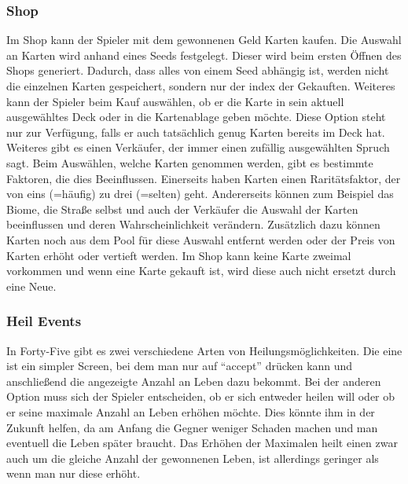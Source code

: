 \subsubsection{Shop}\label{subsubsec:shop}
Im Shop kann der Spieler mit dem gewonnenen Geld Karten kaufen.
Die Auswahl an Karten wird anhand eines Seeds festgelegt.
Dieser wird beim ersten Öffnen des Shops generiert.
Dadurch, dass alles von einem Seed abhängig ist, werden nicht die einzelnen Karten gespeichert, sondern nur der index der Gekauften.
Weiteres kann der Spieler beim Kauf auswählen, ob er die Karte in sein aktuell ausgewähltes Deck oder in die Kartenablage geben möchte.
Diese Option steht nur zur Verfügung, falls er auch tatsächlich genug Karten bereits im Deck hat.
Weiteres gibt es einen Verkäufer, der immer einen zufällig ausgewählten Spruch sagt.
Beim Auswählen, welche Karten genommen werden, gibt es bestimmte Faktoren, die dies Beeinflussen.
Einerseits haben Karten einen Raritätsfaktor, der von eins (=häufig) zu drei (=selten) geht.
Andererseits können zum Beispiel das Biome, die Straße selbst und auch der Verkäufer die Auswahl der Karten beeinflussen und deren Wahrscheinlichkeit verändern.
Zusätzlich dazu können Karten noch aus dem Pool für diese Auswahl entfernt werden oder der Preis von Karten erhöht oder vertieft werden.
Im Shop kann keine Karte zweimal vorkommen und wenn eine Karte gekauft ist, wird diese auch nicht ersetzt durch eine Neue.

\subsubsection{Heil Events}\label{subsubsec:heal-event}
In Forty-Five gibt es zwei verschiedene Arten von Heilungsmöglichkeiten.
Die eine ist ein simpler Screen, bei dem man nur auf ``accept'' drücken kann und anschließend die angezeigte Anzahl an Leben dazu bekommt.
Bei der anderen Option muss sich der Spieler entscheiden, ob er sich entweder heilen will oder ob er seine maximale Anzahl an Leben erhöhen möchte.
Dies könnte ihm in der Zukunft helfen, da am Anfang die Gegner weniger Schaden machen und man eventuell die Leben später braucht.
Das Erhöhen der Maximalen heilt einen zwar auch um die gleiche Anzahl der gewonnenen Leben, ist allerdings geringer als wenn man nur diese erhöht.



